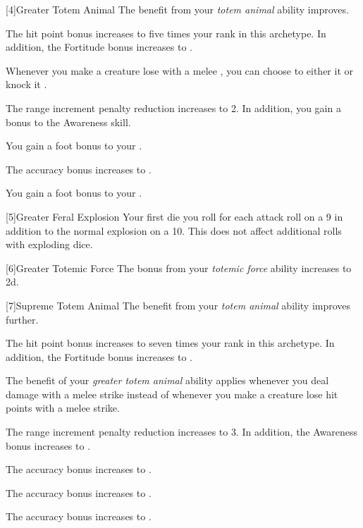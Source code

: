         [4]{Greater Totem Animal} The benefit from your \textit{totem animal} ability improves.
        {
             The hit point bonus increases to five times your rank in this archetype.
            In addition, the Fortitude bonus increases to .

             Whenever you make a creature lose  with a melee , you can choose to either  it or knock it .

             The range increment penalty reduction increases to 2.
            In addition, you gain a  bonus to the Awareness skill.

             You gain a  foot bonus to your .

             The accuracy bonus increases to .

             You gain a  foot bonus to your .
        }

        [5]{Greater Feral Explosion} Your first die you roll for each attack roll  on a 9 in addition to the normal explosion on a 10.
        This does not affect additional rolls with exploding dice.

        [6]{Greater Totemic Force} The bonus from your \textit{totemic force} ability increases to \plus2d.

        [7]{Supreme Totem Animal} The benefit from your \textit{totem animal} ability improves further.
        {
             The hit point bonus increases to seven times your rank in this archetype.
            In addition, the Fortitude bonus increases to .

             The benefit of your \textit{greater totem animal} ability applies whenever you deal damage with a melee strike instead of whenever you make a creature lose hit points with a melee strike.

             The range increment penalty reduction increases to 3.
            In addition, the Awareness bonus increases to .

             The accuracy bonus increases to .

             The accuracy bonus increases to .

             The accuracy bonus increases to .
        }


